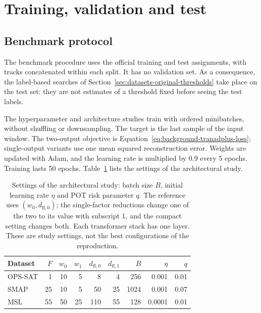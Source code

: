\section{Training, validation and test}
\label{sec:datasets-training}

\subsection{Benchmark protocol}
\label{sec:datasets-original-protocol}

The benchmark procedure uses the official training and test assignments,
with tracks concatenated within each split. It has no validation set. As a
consequence, the label-based searches of
Section~\ref{sec:datasets-original-thresholds} take place on the test set:
they are not estimates of a threshold fixed before seeing the test labels.

The hyperparameter and architecture studies train with ordered minibatches,
without shuffling or downsampling. The target is the last sample of the
input window. The two-output objective is
Equation~\eqref{eq:background-tranadplus-loss}; single-output variants use
one mean squared reconstruction error. Weights are updated with Adam, and
the learning rate is multiplied by \num{0.9} every \num{5} epochs. Training
lasts \num{50} epochs. Table~\ref{tab:datasets-study-settings} lists the
settings of the architectural study.

\begin{table}[htbp]
  \centering
  \small
  \setlength{\tabcolsep}{5pt}
  \begin{tabular}{@{}lrrrrrrrr@{}}
    \toprule
    Dataset & \(F\) & \(w_0\) & \(w_1\) & \(d_{\mathrm{ff},0}\) & \(d_{\mathrm{ff},1}\) & \(B\) & \(\eta\) & \(q\) \\
    \midrule
    \acs{OPS-SAT} & 1 & 10 & 5 & 8 & 4 & 256 & \num{0.001} & \num{0.01} \\
    \acs{SMAP} & 25 & 10 & 5 & 50 & 25 & 1024 & \num{0.001} & \num{0.07} \\
    \acs{MSL} & 55 & 50 & 25 & 110 & 55 & 128 & \num{0.0001} & \num{0.01} \\
    \bottomrule
  \end{tabular}
  \caption{Settings of the architectural study: batch size \(B\), initial
  learning rate \(\eta\) and \acs{POT} risk parameter \(q\). The reference
  uses \((w_0,d_{\mathrm{ff},0})\); the single-factor reductions change one
  of the two to its value with subscript \(1\), and the compact setting
  changes both. Each transformer stack has one layer. These are study
  settings, not the best configurations of the reproduction.}
  \label{tab:datasets-study-settings}
\end{table}

